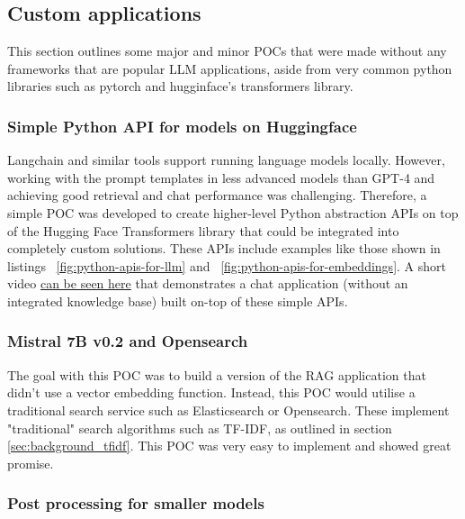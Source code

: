\subsection{Custom applications}


This section outlines some major and minor \gls{POC}s that were made without any frameworks that are popular \gls{LLM} applications, aside from very common python libraries such as pytorch and hugginface’s transformers library.


\subsubsection{Simple Python API for models on Huggingface}


Langchain and similar tools support running language models locally. However, working with the prompt templates in less advanced models than GPT-4 and achieving good retrieval and chat performance was challenging. Therefore, a simple \gls{POC} was developed to create higher-level Python abstraction APIs on top of the Hugging Face Transformers library that could be integrated into completely custom solutions. These APIs include examples like those shown in listings ~\ref{fig:python-apis-for-llm} and ~\ref{fig:python-apis-for-embeddings}. A short video \href{https://www.youtube.com/watch?v=VG16oWK_LUQ}{can be seen here} that demonstrates a chat application (without an integrated knowledge base) built on-top of these simple APIs.






\subsubsection{Mistral 7B v0.2 and Opensearch}


The goal with this \gls{POC} was to build a version of the \gls{RAG} application that didn’t use a vector embedding function. Instead, this \gls{POC} would utilise a traditional search service such as Elasticsearch or Opensearch. These implement "traditional" search algorithms such as \gls{TF-IDF}, as outlined in section \ref{sec:background_tfidf}. This \gls{POC} was very easy to implement and showed great promise.


\subsubsection{Post processing for smaller models}


